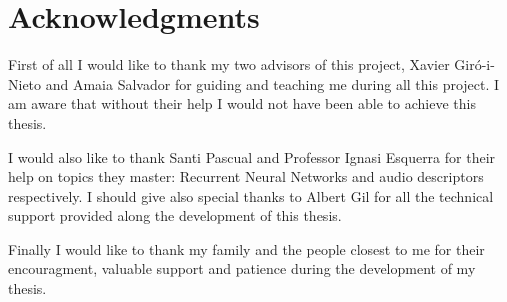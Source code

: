 \chapter*{Acknowledgments}

First of all I would like to thank my two advisors of this project, Xavier Giró-i-Nieto and Amaia Salvador for guiding and teaching me during all this project. I am aware that without their help I would not have been able to achieve this thesis.

I would also like to thank Santi Pascual and Professor Ignasi Esquerra for their help on topics they master: Recurrent Neural Networks and audio descriptors respectively. I should give also special thanks to Albert Gil for all the technical support provided along the development of this thesis.

Finally I would like to thank my family and the people closest to me for their encouragment, valuable support and patience during the development of my thesis.
